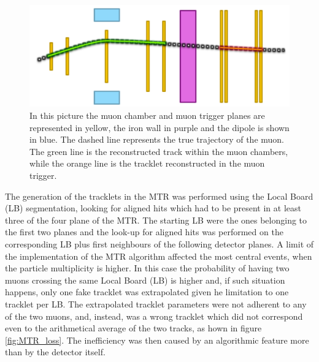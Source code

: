 \begin{figure}[]
\begin{center}
\includegraphics[width=0.9\linewidth]{Chapters/O2/Figs/MTR_logic.png}
\caption{In this picture the muon chamber and muon trigger planes are represented in yellow, the iron wall in purple and the dipole is shown in blue. The dashed line represents the true trajectory of the muon. The green line is the reconstructed track within the muon chambers, while the orange line is the tracklet reconstructed in the muon trigger.}
\label{fig:MTR_old}
\end{center}
\end{figure}

The generation of the tracklets in the MTR was performed using the Local Board (LB) segmentation, looking for
aligned hits which had to be present in at least three of the four plane of the MTR.
The starting LB were the ones belonging to the first two planes and the look-up for aligned hits was performed on the corresponding LB plus first neighbours of the following detector planes.
A limit of the implementation of the MTR algorithm affected the most central events, when the particle multiplicity is higher.
In this case the probability of having two muons crossing the same Local Board (LB) is higher and, if such situation happens, only one fake tracklet was extrapolated given he limitation to one tracklet per LB.
The extrapolated tracklet parameters were not adherent to any of the two muons, and, instead, was a wrong tracklet which did not correspond even to the arithmetical average of the two tracks, as hown in figure \ref{fig:MTR_loss}.
The inefficiency was then caused by an algorithmic feature more than by the detector itself.

